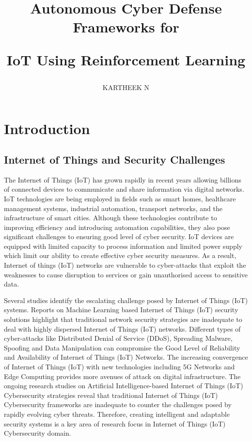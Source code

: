 \documentclass[12pt]{article}
\title{Autonomous Cyber Defense Frameworks for

IoT Using Reinforcement Learning}
\author{KARTHEEK N}
\date{}
\begin{document}
	\maketitle
	
	\section{Introduction}
    \subsection{Internet of Things and Security Challenges}
	The Internet of Things (IoT) has grown rapidly in recent years allowing billions of connected devices to communicate and share information via digital networks. IoT technologies are being employed in fields such as smart homes, healthcare management systems, industrial automation, transport networks, and the infrastructure of smart cities. Although these technologies contribute to improving efficiency and introducing automation capabilities, they also pose significant challenges to ensuring good level of cyber security. IoT devices are equipped with limited capacity to process information and limited power supply which limit our ability to create effective cyber security measures. As a result, Internet of things (IoT) networks are vulnerable to cyber-attacks that exploit the weaknesses to cause disruption to services or gain unauthorised access to sensitive data.

Several studies identify the escalating challenge posed by Internet of Things (IoT) systems. Reports on Machine Learning based Internet of Things (IoT) security solutions highlight that traditional network security strategies are inadequate to deal with highly dispersed Internet of Things (IoT) networks. Different types of cyber-attacks like Distributed Denial of Service (DDoS), Spreading Malware, Spoofing and Data Manipulation can compromise the Good Level of Reliability and Availability of Internet of Things (IoT) Networks. The increasing convergence of Internet of Things (IoT) with new technologies including 5G Networks and Edge Computing provides more avenues of attack on digital infrastructure. The ongoing research studies on Artificial Intelligence-based Internet of Things (IoT) Cybersecurity strategies reveal that traditional Internet of Things (IoT) Cybersecurity frameworks are inadequate to counter the challenges posed by rapidly evolving cyber threats. Therefore, creating intelligent and adaptable security systems is a key area of research focus in Internet of Things (IoT) Cybersecurity domain.\cite{Li2024, Cevallos2023}
\end{document}
